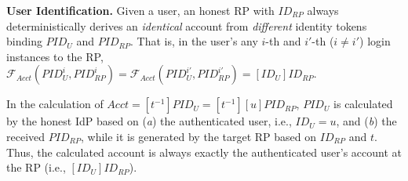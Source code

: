 
\vspace{0.5mm}
\noindent\textbf{User Identification.}
Given a user, an honest RP with $ID_{RP}$ always deterministically derives an \emph{identical} account from \emph{different} identity tokens binding $PID_U$ and $PID_{RP}$.
That is,
    in the user's any $i$-th and $i'$-th ($i \neq i'$) login instances to the RP,
 $\mathcal{F}_{Acct}(PID_{U}^i, PID_{RP}^i) = \mathcal{F}_{Acct}(PID_{U}^{i'}, PID_{RP}^{i'}) = [ID_U]ID_{RP}$.

In the calculation of $Acct = [t^{-1}]PID_U = [t^{-1}][u]PID_{RP}$,
$PID_U$ is calculated by the honest IdP based on (\emph{a}) the authenticated user, i.e., $ID_U = u$, and (\emph{b}) the received $PID_{RP}$, while it is generated by the target RP based on $ID_{RP}$ and $t$.
Thus, the calculated account is always exactly the authenticated user's account at the RP (i.e., $[ID_U]ID_{RP}$).





